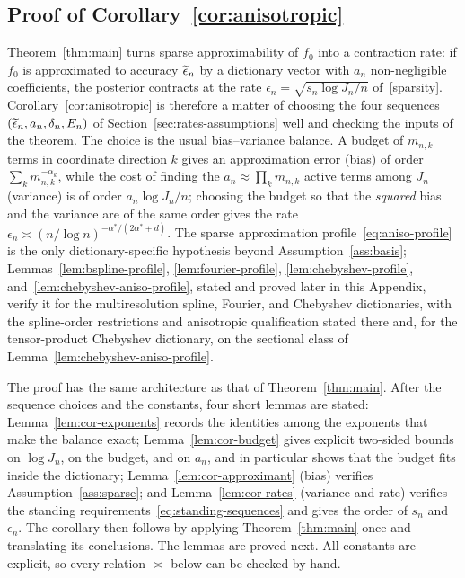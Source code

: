 \subsection*{Proof of Corollary~\ref{cor:anisotropic}}

Theorem~\ref{thm:main} turns sparse approximability of $f_0$ into a contraction rate: if $f_0$ is approximated to accuracy $\widetilde{\epsilon}_n$ by a dictionary vector with $a_n$ non-negligible coefficients, the posterior contracts at the rate $\epsilon_n=\sqrt{s_n\log J_n/n}$ of~\eqref{sparsity}. Corollary~\ref{cor:anisotropic} is therefore a matter of choosing the four sequences $(\widetilde{\epsilon}_n,a_n,\delta_n,E_n)$ of Section~\ref{sec:rates-assumptions} well and checking the inputs of the theorem. The choice is the usual bias--variance balance. A budget of $m_{n,k}$ terms in coordinate direction $k$ gives an approximation error (bias) of order $\sum_km_{n,k}^{-\alpha_k}$, while the cost of finding the $a_n\approx\prod_km_{n,k}$ active terms among $J_n$ (variance) is of order $a_n\log J_n/n$; choosing the budget so that the \emph{squared} bias and the variance are of the same order gives the rate $\epsilon_n\asymp(n/\log n)^{-\alpha^*/(2\alpha^*+d)}$. The sparse approximation profile~\eqref{eq:aniso-profile} is the only dictionary-specific hypothesis beyond Assumption~\ref{ass:basis}; Lemmas~\ref{lem:bspline-profile}, \ref{lem:fourier-profile}, \ref{lem:chebyshev-profile}, and~\ref{lem:chebyshev-aniso-profile}, stated and proved later in this Appendix, verify it for the multiresolution spline, Fourier, and Chebyshev dictionaries, with the spline-order restrictions and anisotropic qualification stated there and, for the tensor-product Chebyshev dictionary, on the sectional class of Lemma~\ref{lem:chebyshev-aniso-profile}.

The proof has the same architecture as that of Theorem~\ref{thm:main}. After the sequence choices and the constants, four short lemmas are stated: Lemma~\ref{lem:cor-exponents} records the identities among the exponents that make the balance exact; Lemma~\ref{lem:cor-budget} gives explicit two-sided bounds on $\log J_n$, on the budget, and on $a_n$, and in particular shows that the budget fits inside the dictionary; Lemma~\ref{lem:cor-approximant} (bias) verifies Assumption~\ref{ass:sparse}; and Lemma~\ref{lem:cor-rates} (variance and rate) verifies the standing requirements~\eqref{eq:standing-sequences} and gives the order of $s_n$ and $\epsilon_n$. The corollary then follows by applying Theorem~\ref{thm:main} once and translating its conclusions. The lemmas are proved next. All constants are explicit, so every relation $\asymp$ below can be checked by hand.

